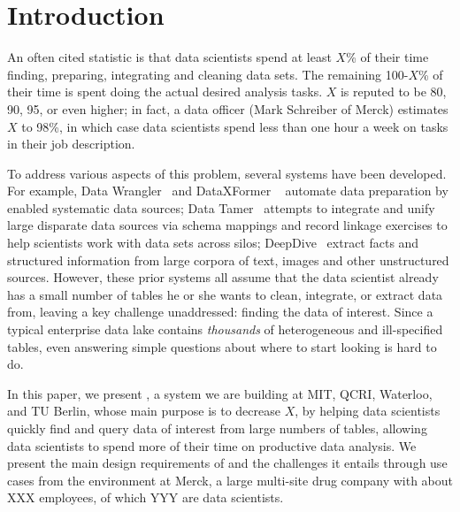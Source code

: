 \section{Introduction}
\label{introduction}

An often cited statistic is that data scientists spend at least
$X$\% of their time finding, preparing, integrating and cleaning data sets.
The remaining 100-$X$\% of their time is spent doing the actual desired analysis
tasks.  $X$ is reputed to be 80, 90, 95, or even higher;  in fact,  
a data officer (Mark Schreiber
of Merck) estimates $X$ to 98\%, in which case data
scientists spend less than one hour a week on tasks in their job description.


To address various aspects of this problem, several systems have been developed.  For example, 
  Data Wrangler~\cite{2011-wrangler} and DataXFormer ~\cite{DBLP:conf/icde/AbedjanMIOPS16} automate data preparation by enabled systematic data sources; 
Data Tamer~\cite{DBLP:conf/cidr/StonebrakerBIBCZPX13} attempts to integrate and unify large disparate data sources via schema mappings and record linkage exercises to help scientists work with data sets across silos; 
DeepDive~\cite{DBLP:journals/pvldb/ShinWWSZR15} extract facts and structured information from large corpora of text, images and other unstructured sources.
However, these prior systems all assume that the
data scientist already has a small number of tables he or she wants to clean, integrate, or extract data from, leaving a key challenge unaddressed: finding the data of interest.  Since a typical enterprise data lake contains {\it thousands} of heterogeneous and ill-specified tables, even answering simple questions about where to start looking is hard to do.  

In this paper, we present 
\dcv, a system we are building
at MIT, QCRI, Waterloo, and TU Berlin, whose main purpose  is to decrease $X$, by helping data scientists quickly find and query data of interest from large numbers of tables, allowing 
data scientists to spend more of their time on productive data analysis.  We present the main  design requirements of \dcv and the challenges it entails through use cases from the environment at Merck,  a large multi-site drug company with about XXX employees, of which YYY are data scientists.



